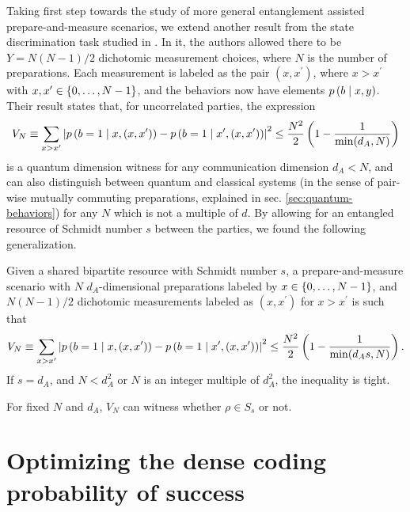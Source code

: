         Taking first step towards the study of more general entanglement assisted prepare-and-measure scenarios, we extend another result from the state discrimination task studied in \cite{brunner_dimension_2013}. In it, the authors allowed there to be $Y = N (N-1)/2$ dichotomic measurement choices, where $N$ is the number of preparations. Each measurement is labeled as the pair $(x, x^\prime)$, where $x > x^\prime$ with $x, x^\prime \in \{ 0, \ldots, N-1 \}$, and the behaviors now have elements $p \left( b \mid x,y \right)$. Their result states that, for uncorrelated parties, the expression
        $$
            V_N \equiv \sum_{x > x^\prime} \abs{ p \left( b=1 \mid x, (x, x^\prime) \right) - p \left( b=1 \mid x^\prime, (x, x^\prime) \right) }^2 \leq \frac{N^2}{2} \left( 1 - \frac{1}{\min(d_A,N)} \right)
        $$
        is a quantum dimension witness for any communication dimension $d_A < N$, and can also distinguish between quantum and classical systems (in the sense of pair-wise mutually commuting preparations, explained in sec. \ref{sec:quantum-behaviors}) for any $N$ which is not a multiple of $d$. By allowing for an entangled resource of Schmidt number $s$ between the parties, we found the following generalization.
        
        \begin{result}
            Given a shared bipartite resource with Schmidt number $s$, a prepare-and-measure scenario with $N$ $d_A$-dimensional preparations labeled by $x \in \{ 0, \ldots, N-1 \}$, and $N (N-1)/2$ dichotomic measurements labeled as $(x, x^\prime)$ for $x > x^\prime$ is such that
            $$
                V_N \equiv \sum_{x > x^\prime} \abs{ p \left( b=1 \mid x, (x, x^\prime) \right) - p \left( b=1 \mid x^\prime, (x, x^\prime) \right) }^2 \leq \frac{N^2}{2} \left( 1 - \frac{1}{\min(d_A s,N)} \right) .
            $$
            If $s = d_A$, and $N < d_A^2$ or $N$ is an integer multiple of $d_A^2$, the inequality is tight.
            \label{res:more-measurements}
        \end{result}
        
        For fixed $N$ and $d_A$, $V_N$ can witness whether $\rho \in S_s$ or not.
    

    \section{Optimizing the dense coding probability of success}
    \label{sec:pam-quantum-optimization}

